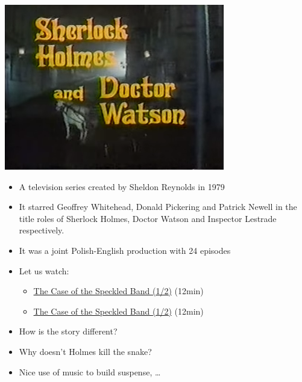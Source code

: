 \documentclass[a4paper,landscape,headrule,footrule,xetex]{foils}
\begin{document}
\begin{center}
  \includegraphics[height=0.6\textheight]{pics/Sherlock_Holmes_and_Doctor_Watson_title_card.png}
\end{center}
\vspace{-1ex}
\begin{itemize} 
\item A television series created by Sheldon Reynolds in 1979
\item  It starred Geoffrey Whitehead, Donald Pickering and Patrick     
  Newell in the title roles of Sherlock Holmes, Doctor Watson and
  Inspector Lestrade respectively.
\item It was a joint Polish-English production with 24 episodes
\end{itemize}

\begin{itemize}
    
  \item Let us watch:
    \begin{itemize}
    \item \href{https://www.youtube.com/watch?v=1pGT51t5xNE}{The Case of
        the Speckled
        Band (1/2)} (12min)
    \item \href{https://www.youtube.com/watch?v=L83Ugq8o3i8}{The Case of
        the  Speckled
        Band (1/2)} (12min)
    \end{itemize}
\item How is the story different?
\item Why doesn’t Holmes kill the snake?
\item Nice use of music to build suspense, \dots{}
\end{itemize}
\end{document}
